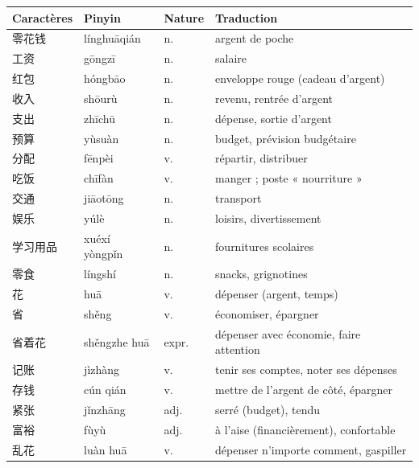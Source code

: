 \documentclass[11pt]{article}
\begin{document}
\begin{center}
\begin{tabularx}{\linewidth}{|X|X|X|X|}
\hline
\rowcolor{popblueL} Caractères & Pinyin & Nature & Traduction \\
\hline
零花钱 & línghuāqián & n. & argent de poche \\
\hline
工资 & gōngzī & n. & salaire \\
\hline
红包 & hóngbāo & n. & enveloppe rouge (cadeau d'argent) \\
\hline
收入 & shōurù & n. & revenu, rentrée d'argent \\
\hline
支出 & zhīchū & n. & dépense, sortie d'argent \\
\hline
预算 & yùsuàn & n. & budget, prévision budgétaire \\
\hline
分配 & fēnpèi & v. & répartir, distribuer \\
\hline
吃饭 & chīfàn & v. & manger ; poste « nourriture » \\
\hline
交通 & jiāotōng & n. & transport \\
\hline
娱乐 & yúlè & n. & loisirs, divertissement \\
\hline
学习用品 & xuéxí yòngpǐn & n. & fournitures scolaires \\
\hline
零食 & língshí & n. & snacks, grignotines \\
\hline
花 & huā & v. & dépenser (argent, temps) \\
\hline
省 & shěng & v. & économiser, épargner \\
\hline
省着花 & shěngzhe huā & expr. & dépenser avec économie, faire attention \\
\hline
记账 & jìzhàng & v. & tenir ses comptes, noter ses dépenses \\
\hline
存钱 & cún qián & v. & mettre de l'argent de côté, épargner \\
\hline
紧张 & jǐnzhāng & adj. & serré (budget), tendu \\
\hline
富裕 & fùyù & adj. & à l'aise (financièrement), confortable \\
\hline
乱花 & luàn huā & v. & dépenser n'importe comment, gaspiller \\
\hline
\end{tabularx}
\end{center}
\end{document}
